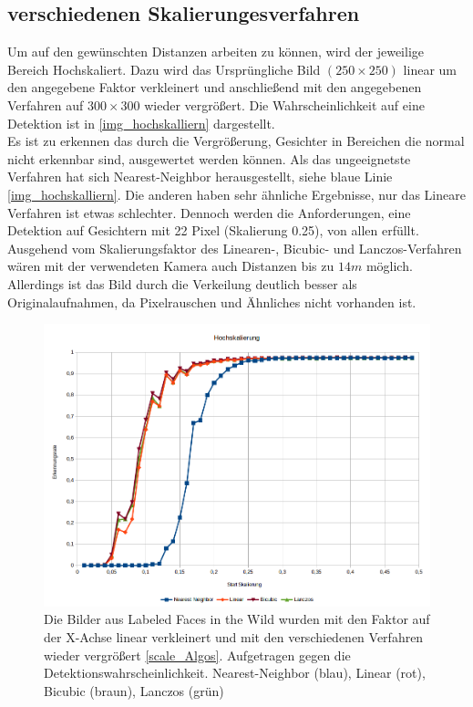 \subsection{verschiedenen Skalierungesverfahren}
Um auf den gewünschten Distanzen arbeiten zu können, wird der jeweilige Bereich Hochskaliert. Dazu wird das Ursprüngliche Bild $(250\times 250)$ linear um den angegebene Faktor verkleinert und anschließend mit den angegebenen Verfahren auf $300\times 300$ wieder vergrößert. Die Wahrscheinlichkeit auf eine Detektion ist in \autoref{img_hochskalliern} dargestellt.\\
Es ist zu erkennen das durch die Vergrößerung, Gesichter in Bereichen die normal nicht erkennbar sind, ausgewertet werden können. Als das ungeeignetste Verfahren hat sich Nearest-Neighbor herausgestellt, siehe blaue Linie \autoref{img_hochskalliern}. Die anderen haben sehr ähnliche Ergebnisse, nur das Lineare Verfahren ist etwas schlechter. Dennoch werden die Anforderungen, eine Detektion auf Gesichtern mit 22 Pixel (Skalierung 0.25), von allen erfüllt.\\
Ausgehend vom Skalierungsfaktor des Linearen-, Bicubic- und Lanczos-Verfahren wären mit der verwendeten Kamera auch Distanzen bis zu $14m$ möglich. Allerdings ist das Bild durch die Verkeilung  deutlich besser als Originalaufnahmen, da Pixelrauschen und Ähnliches nicht vorhanden ist.
\begin{figure}
	\centering
	\includegraphics[width=0.5\linewidth]{img/Hochskalliern}
	\caption{Die Bilder aus Labeled Faces in the Wild \cite{database_Face} wurden mit den Faktor auf der X-Achse linear verkleinert und mit den verschiedenen Verfahren wieder vergrößert \autoref{scale_Algos}. Aufgetragen gegen die Detektionswahrscheinlichkeit.
		Nearest-Neighbor (blau), Linear (rot), Bicubic (braun), Lanczos (grün)}
	\label{img_hochskalliern}
\end{figure}
